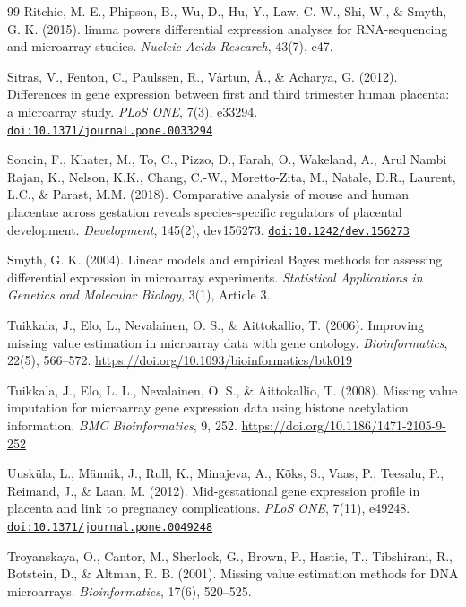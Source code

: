 \documentclass[11pt,a4paper]{article}
\newcommand{\doi}[1]{\href{https://doi.org/#1}{\texttt{doi:#1}}}
\begin{document}
\begin{thebibliography}{99}
Ritchie, M. E., Phipson, B., Wu, D., Hu, Y., Law, C. W., Shi, W.,
\& Smyth, G. K. (2015). limma powers differential expression
analyses for RNA-sequencing and microarray studies.
\emph{Nucleic Acids Research}, 43(7), e47.

Sitras, V., Fenton, C., Paulssen, R., V\aa{}rtun, \AA., \&
Acharya, G. (2012). Differences in gene expression between first
and third trimester human placenta: a microarray study.
\emph{PLoS ONE}, 7(3), e33294.
\doi{10.1371/journal.pone.0033294}

Soncin, F., Khater, M., To, C., Pizzo, D., Farah, O.,
Wakeland, A., Arul Nambi Rajan, K., Nelson, K.K., Chang, C.-W.,
Moretto-Zita, M., Natale, D.R., Laurent, L.C., \& Parast, M.M.
(2018). Comparative analysis of mouse and human placentae across
gestation reveals species-specific regulators of placental
development. \emph{Development}, 145(2), dev156273.
\doi{10.1242/dev.156273}

Smyth, G. K. (2004). Linear models and empirical Bayes methods
for assessing differential expression in microarray experiments.
\emph{Statistical Applications in Genetics and Molecular
Biology}, 3(1), Article 3.

Tuikkala, J., Elo, L., Nevalainen, O. S., \& Aittokallio, T.
(2006). Improving missing value estimation in microarray data
with gene ontology. \emph{Bioinformatics}, 22(5), 566--572.
\url{https://doi.org/10.1093/bioinformatics/btk019}

Tuikkala, J., Elo, L. L., Nevalainen, O. S., \& Aittokallio, T.
(2008). Missing value imputation for microarray gene expression
data using histone acetylation information.
\emph{BMC Bioinformatics}, 9, 252.
\url{https://doi.org/10.1186/1471-2105-9-252}

Uusk\"{u}la, L., M\"{a}nnik, J., Rull, K., Minajeva, A.,
K\~{o}ks, S., Vaas, P., Teesalu, P., Reimand, J., \& Laan, M.
(2012). Mid-gestational gene expression profile in placenta and
link to pregnancy complications. \emph{PLoS ONE}, 7(11), e49248.
\doi{10.1371/journal.pone.0049248}

Troyanskaya, O., Cantor, M., Sherlock, G., Brown, P., Hastie, T.,
Tibshirani, R., Botstein, D., \& Altman, R. B. (2001). Missing
value estimation methods for DNA microarrays.
\emph{Bioinformatics}, 17(6), 520--525.


\end{thebibliography}
\end{document}
